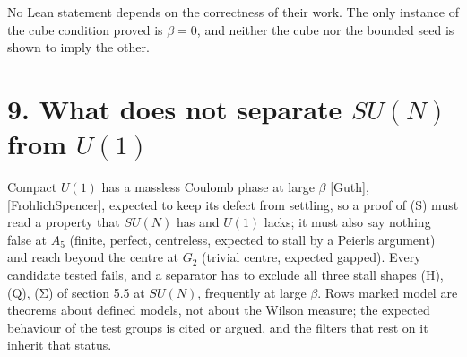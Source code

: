 \documentclass[10pt,letterpaper,twocolumn]{article}
\begin{document}
No Lean statement depends on the correctness of their work. The only instance of the cube condition proved is \(\beta=0\), and neither the cube nor the bounded seed is shown to imply the other.

\section{\texorpdfstring{9. What does not separate \(SU(N)\) from \(U(1)\)}{9. What does not separate SU(N) from U(1)}}\label{9-what-does-not-separate-sun-from-u1}

Compact \(U(1)\) has a massless Coulomb phase at large \(\beta\) {[}Guth{]}, {[}FrohlichSpencer{]}, expected to keep its defect from settling, so a proof of (S) must read a property that \(SU(N)\) has and \(U(1)\) lacks; it must also say nothing false at \(A_5\) (finite, perfect, centreless, expected to stall by a Peierls argument) and reach beyond the centre at \(G_2\) (trivial centre, expected gapped). Every candidate tested fails, and a separator has to exclude all three stall shapes (H), (Q), (Σ) of section 5.5 at \(SU(N)\), frequently at large \(\beta\). Rows marked model are theorems about defined models, not about the Wilson measure; the expected behaviour of the test groups is cited or argued, and the filters that rest on it inherit that status.
\end{document}

